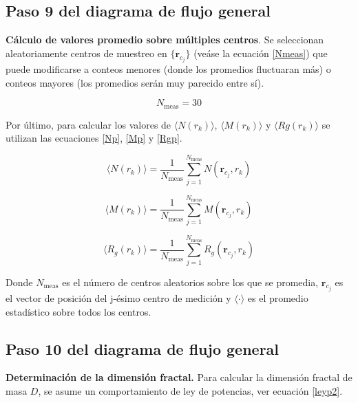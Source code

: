 	 	
 	\subsection{Paso 9 del diagrama de flujo general}
 	
 	\textbf{Cálculo de valores promedio sobre múltiples centros}. Se seleccionan aleatoriamente centros de muestreo en $\{\mathbf{r}_{c_j}\}$ (veáse la ecuación \ref{Nmeas}) que puede modificarse a conteos menores (donde los promedios fluctuaran más) o conteos mayores (los promedios serán muy parecido entre sí). 
 	
 	
 	\begin{equation}
 		N_{\text{meas}} = 30  
 		\label{Nmeas}
 	\end{equation}
 	
 	Por último, para calcular los valores de $\langle N(r_k) \rangle$, $\langle M(r_k) \rangle$ y $\langle Rg(r_k) \rangle$ se utilizan las ecuaciones \ref{Np}, \ref{Mp} y \ref{Rgp}.
 	
 	\begin{equation}
 		\langle N(r_k) \rangle = \frac{1}{N_{\text{meas}}} 
 		\sum_{j=1}^{N_{\text{meas}}} N(\mathbf{r}_{c_j}, r_k)
 		\label{Np}
 	\end{equation}
 	
 	\begin{equation}
 		\langle M(r_k) \rangle = \frac{1}{N_{\text{meas}}} 
 		\sum_{j=1}^{N_{\text{meas}}} M(\mathbf{r}_{c_j}, r_k)
 		\label{Mp}
 	\end{equation}
 	
 	\begin{equation}
 		\langle R_g(r_k) \rangle = \frac{1}{N_{\text{meas}}} 
 		\sum_{j=1}^{N_{\text{meas}}} R_g(\mathbf{r}_{c_j}, r_k)
 		\label{Rgp}
 	\end{equation}
 	
 	Donde $	N_{\text{meas}}$ es el número de centros aleatorios sobre los que se promedia,
 	$\mathbf{r}_{c_j}$ es el vector de posición del j-ésimo centro de medición y
 	$\langle\cdot\rangle$ es el promedio estadístico sobre todos los centros.	

 	
 	\subsection{Paso 10 del diagrama de flujo general}
 	
 	\textbf{Determinación de la dimensión fractal.}	 
 	Para calcular la dimensi\'{o}n fractal de masa $D$, 
 	se asume un comportamiento de ley de potencias, 
 	ver ecuación \ref{leyp2}.
 	
